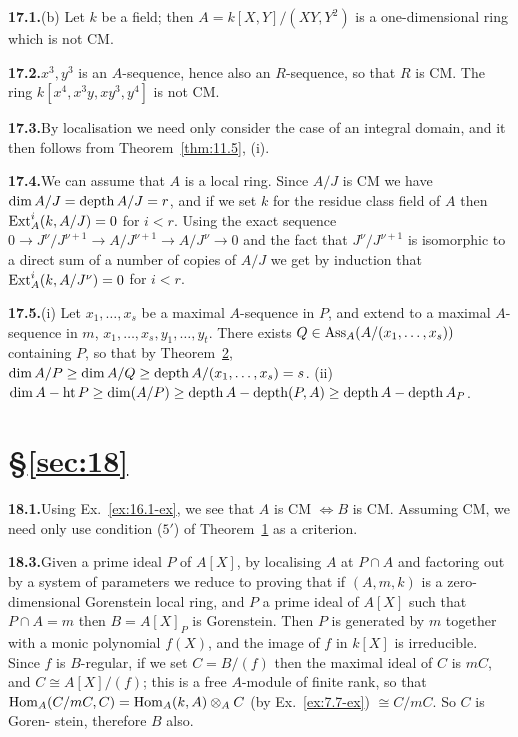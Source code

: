 \noindent\textbf{17.1.}\quad (b) Let $k$ be a field; then $A = k[X, Y]/(XY, Y^2)$ is a one-dimensional
ring which is not CM.

\noindent\textbf{17.2.}\quad $x^3, y^3$ is an $A$-sequence, hence also an $R$-sequence, so that $R$ is CM. The
ring $k[x^4, x^3y, xy^3, y^4]$ is not CM.

\noindent\textbf{17.3.}\quad By localisation we need only consider the case of an integral domain, and
it then follows from Theorem~\ref{thm:11.5}, (i).

\noindent\textbf{17.4.}\quad We can assume that $A$ is a local ring. Since $A/J$ is CM we have $\dim
A/J = \operatorname{depth} A/J = r$, and if we set $k$ for the residue class field of $A$ then
$\operatorname{Ext}^i_A(k, A/J) = 0$ for $i < r$. Using the exact sequence $0 \to
J^\nu/J^{\nu+1} \to A/J^{\nu+1} \to A/J^\nu \to 0$ and the fact that $J^\nu/J^{\nu+1}$ is isomorphic
to a direct sum of a number of copies of $A/J$ we get by induction that
$\operatorname{Ext}^i_A(k, A/J^\nu) = 0$ for $i < r$.

\noindent\textbf{17.5.}\quad (i) Let $x_1, \ldots, x_s$ be a maximal $A$-sequence in $P$, and extend to a maximal $A$-
sequence in $m$, $x_1, \ldots, x_s, y_1, \ldots, y_t$. There exists $Q \in \operatorname{Ass}_A(A/(x_1, \ldots, x_s))$
containing $P$, so that by Theorem~\hyperref[thm:17.2]{2}, $\dim A/P \ge \dim A/Q \ge \operatorname{depth}
A/(x_1, \ldots, x_s) = s$. (ii) $\dim A - \operatorname{ht} P \ge \dim (A/P) \ge \operatorname{depth} A - \operatorname{depth} (P, A) \ge \operatorname{depth} A -
\operatorname{depth} A_P$.

\section*{\S\ref{sec:18}}

\noindent\textbf{18.1.}\quad Using Ex.~\ref{ex:16.1-ex}, we see that $A$ is CM $\iff B$ is CM. Assuming CM, we need
only use condition ($5'$) of Theorem~\hyperref[thm:18.1]{1} as a criterion.

\noindent\textbf{18.3.}\quad Given a prime ideal $P$ of $A[X]$, by localising $A$ at $P \cap A$ and factoring out
by a system of parameters we reduce to proving that if $(A, m, k)$ is a zero-
dimensional Gorenstein local ring, and $P$ a prime ideal of $A[X]$ such that
$P \cap A = m$ then $B = A[X]_P$ is Gorenstein. Then $P$ is generated by $m$ together
with a monic polynomial $f(X)$, and the image of $f$ in $k[X]$ is irreducible.
Since $f$ is $B$-regular, if we set $C = B/(f)$ then the maximal ideal of $C$ is
$mC$, and $C \cong A[X]/(f)$; this is a free $A$-module of finite rank, so that
$\operatorname{Hom}_A(C/mC, C) = \operatorname{Hom}_A(k, A) \otimes_A C$ (by Ex.~\ref{ex:7.7-ex}) $\cong C/mC$. So $C$ is Goren-
stein, therefore $B$ also.

